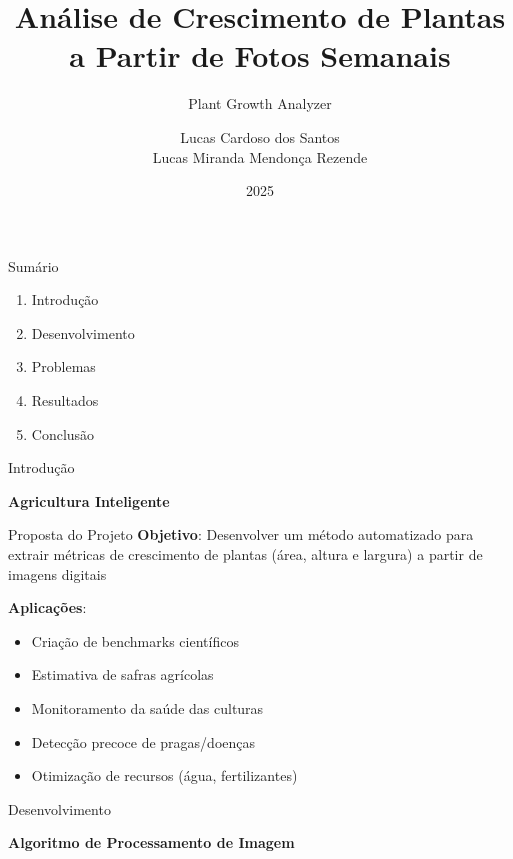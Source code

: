 \documentclass[landscape, 12pt]{beamer}
\title{Análise de Crescimento de Plantas a Partir de Fotos Semanais}
\subtitle{Plant Growth Analyzer}
\author{
    Lucas Cardoso dos Santos \\
    Lucas Miranda Mendonça Rezende
}
\institute{Universidade de São Paulo - Ribeirão Preto}
\date{2025}
\begin{document}
\begin{frame}
    \titlepage
\end{frame}

\begin{frame}{Sumário}
    \begin{enumerate}
        \item Introdução
        \item Desenvolvimento
        \item Problemas
        \item Resultados
        \item Conclusão
    \end{enumerate}
\end{frame}

\begin{frame}{Introdução}
    \begin{center}
        \textbf{Agricultura Inteligente}
    \end{center}
\end{frame}

\begin{frame}{Proposta do Projeto}
    \textbf{Objetivo}: Desenvolver um método automatizado para extrair métricas de crescimento de plantas (área, altura e largura) a partir de imagens digitais
    
    \vspace{0.5cm}
    \textbf{Aplicações}:
    \begin{itemize}
        \item Criação de benchmarks científicos
        \item Estimativa de safras agrícolas
        \item Monitoramento da saúde das culturas
        \item Detecção precoce de pragas/doenças
        \item Otimização de recursos (água, fertilizantes)
    \end{itemize}
\end{frame}

\begin{frame}{Desenvolvimento}
    \begin{center}
        \textbf{Algoritmo de Processamento de Imagem}
    \end{center}
\end{frame}
\end{document}
